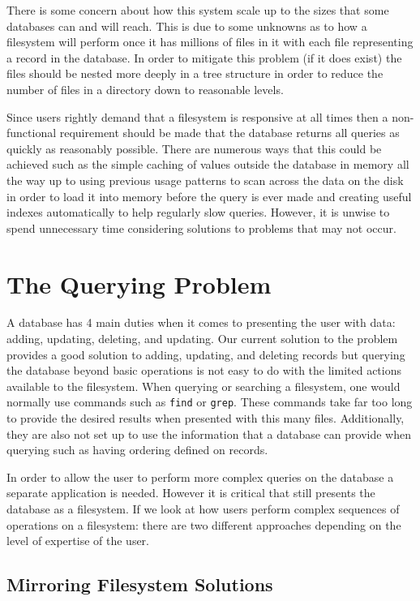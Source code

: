 There is some concern about how this system scale up to the sizes that some
databases can and will reach. This is due to some unknowns as to how
a filesystem will perform once it has millions of files in it with each file
representing a record in the database. In order to mitigate this problem (if it
does exist) the files should be nested more deeply in a tree structure in order
to reduce the number of files in a directory down to reasonable levels.

Since users rightly demand that a filesystem is responsive at all times then
a non-functional requirement should be made that the database returns all
queries as quickly as reasonably possible. There are numerous ways that this
could be achieved such as the simple caching of values outside the database in
memory all the way up to using previous usage patterns to scan across the data
on the disk in order to load it into memory before the query is ever made and
creating useful indexes automatically to help regularly slow queries. However,
it is unwise to spend unnecessary time considering solutions to problems that
may not occur.

\section{The Querying Problem}

A database has 4 main duties when it comes to presenting the user with data:
adding, updating, deleting, and updating. Our current solution to the problem
provides a good solution to adding, updating, and deleting records but querying
the database beyond basic operations is not easy to do with the limited actions
available to the filesystem. When querying or searching a filesystem, one would
normally use commands such as \texttt{find} or \texttt{grep}. These commands
take far too long to provide the desired results when presented with this many
files. Additionally, they are also not set up to use the information that
a database can provide when querying such as having ordering defined on
records.

In order to allow the user to perform more complex queries on the database
a separate application is needed. However it is critical that still presents
the database as a filesystem. If we look at how users perform complex sequences
of operations on a filesystem: there are two different approaches depending on
the level of expertise of the user.

\subsection{Mirroring Filesystem Solutions}

